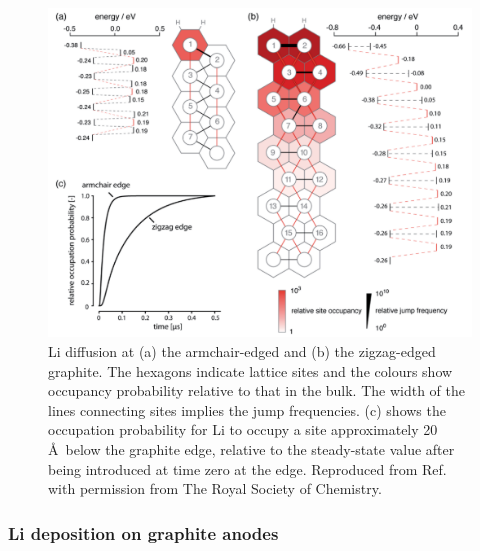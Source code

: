 \documentclass[../main.tex]{subfiles}
\begin{document}
\begin{figure}
    \centering
    \includegraphics[scale=0.5]{figures/Graphite_edge_effects.PNG}
    \caption{Li diffusion at (a) the armchair-edged and (b) the zigzag-edged graphite. The hexagons indicate lattice sites and the colours show occupancy probability relative to that in the bulk. The width of the lines connecting sites implies the jump frequencies. (c) shows the occupation probability for Li to occupy a site approximately 20 \AA \ below the graphite edge, relative to the steady-state value after being introduced at time zero at the edge. Reproduced from Ref.~ with permission from The Royal Society of Chemistry.}
    \label{fig:Li_diffusion_edge}
\end{figure}

\subsubsection{Li deposition on graphite anodes}
\label{sec:li_deposition}
\end{document}
